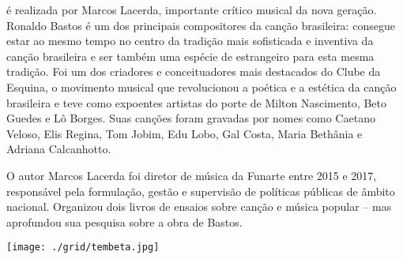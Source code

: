 \medskip

 é  realizada por Marcos Lacerda, importante crítico musical da nova geração. Ronaldo Bastos é um dos principais compositores da canção brasileira: consegue estar ao mesmo tempo no centro da tradição mais sofisticada e inventiva da canção brasileira e ser também uma espécie de estrangeiro para esta mesma tradição. Foi um dos criadores e conceituadores mais destacados do Clube da Esquina, o movimento musical que revolucionou a poética e a estética da canção brasileira e teve como expoentes artistas do porte de Milton Nascimento, Beto Guedes e Lô Borges. Suas canções foram gravadas por nomes como Caetano Veloso, Elis Regina, Tom Jobim, Edu Lobo, Gal Costa, Maria Bethânia e Adriana Calcanhotto.

O autor Marcos Lacerda foi diretor de música da Funarte entre 2015 e 2017, responsável pela formulação, gestão e supervisão de políticas públicas de âmbito nacional. Organizou dois livros de ensaios sobre canção e música popular – mas aprofundou sua pesquisa sobre a obra de Bastos.

\vfill

\hspace*{-.4cm}\begin{minipage}[c]{1\linewidth}
\small{
{}}
\end{minipage}

\pagebreak

\begin{center}
\hspace*{-3.6cm}
\hspace*{3.1cm}\texttt{[image: ./grid/tembeta.jpg]}
\end{center}

\hspace*{-7cm}\hrulefill\hspace*{-7cm}

